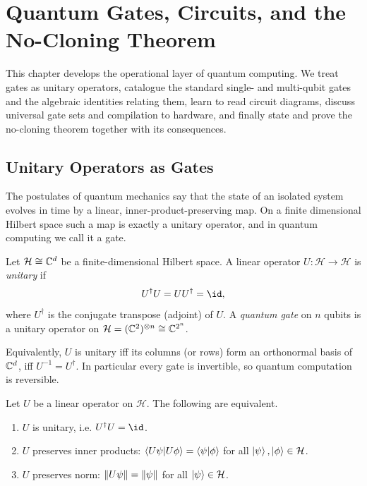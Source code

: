 \chapter{Quantum Gates, Circuits, and the No-Cloning Theorem}

This chapter develops the operational layer of quantum computing. We treat gates
as unitary operators, catalogue the standard single- and multi-qubit gates and
the algebraic identities relating them, learn to read circuit diagrams, discuss
universal gate sets and compilation to hardware, and finally state and prove the
no-cloning theorem together with its consequences.

\section{Unitary Operators as Gates}

The postulates of quantum mechanics say that the state of an isolated system
evolves in time by a linear, inner-product-preserving map. On a finite
dimensional Hilbert space such a map is exactly a unitary operator, and in
quantum computing we call it a gate.

\begin{definition}
Let $\mathcal{H}\cong\mathbb{C}^{d}$ be a finite-dimensional Hilbert space. A linear
operator $U:\mathcal{H}\to\mathcal{H}$ is \emph{unitary} if
\[
  U^{\dagger}U = U U^{\dagger} = \id,
\]
where $U^{\dagger}$ is the conjugate transpose (adjoint) of $U$. A
\emph{quantum gate} on $n$ qubits is a unitary operator on
$\mathcal{H}=(\mathbb{C}^{2})^{\otimes n}\cong\mathbb{C}^{2^{n}}$.
\end{definition}

Equivalently, $U$ is unitary iff its columns (or rows) form an orthonormal basis
of $\mathbb{C}^{d}$, iff $U^{-1}=U^{\dagger}$. In particular every gate is invertible, so
quantum computation is reversible.

\begin{theorem}
\label{l2:thm:unitary-preserves}
Let $U$ be a linear operator on $\mathcal{H}$. The following are equivalent.
\begin{enumerate}[label=\textup{(\roman*)}]
  \item $U$ is unitary, i.e. $U^{\dagger}U=\id$.
  \item $U$ preserves inner products: $\braket{U\psi|U\phi}=\braket{\psi|\phi}$
        for all $\ket{\psi},\ket{\phi}\in\mathcal{H}$.
  \item $U$ preserves norm: $\lVert U\psi\rVert=\lVert\psi\rVert$ for all
        $\ket{\psi}\in\mathcal{H}$.
\end{enumerate}
\end{theorem}

